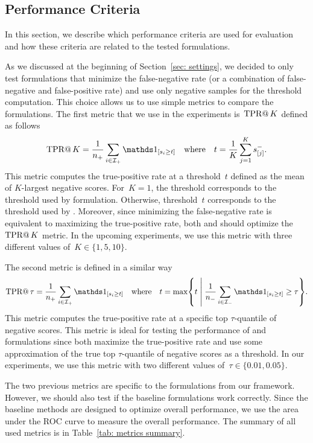 \pagebreak

\subsection{Performance Criteria}\label{sec: performance criteria}

In this section, we describe which performance criteria are used for evaluation and how these criteria are related to the tested formulations.

As we discussed at the beginning of Section~\ref{sec: settings}, we decided to only test formulations that minimize the false-negative rate (or a combination of false-negative and false-positive rate) and use only negative samples for the threshold computation. This choice allows us to use simple metrics to compare the formulations. The first metric that we use in the experiments is~$\operatorname{TPR@}K$ defined as follows
\begin{equation*}
  \tpratk = \frac{1}{\npos} \sum_{i \in \Ipos} \Iverson{s_i \geq t} \quad \text{where} \quad t = \frac{1}{K} \sum_{j = 1}^{K} s^{-}_{[j]}.
\end{equation*}
This metric computes the true-positive rate at a threshold~$t$ defined as the mean of $K$-largest negative scores. For~$K = 1$, the threshold corresponds to the threshold used by \TopPush formulation. Otherwise, threshold~$t$ corresponds to the threshold used by \TopPushK. Moreover, since minimizing the false-negative rate is equivalent to maximizing the true-positive rate, both \TopPush and \TopPushK should optimize the $\operatorname{TPR@}K$ metric. In the upcoming experiments, we use this metric with three different values of~$K \in \{1, 5, 10\}.$

The second metric is defined in a similar way
\begin{equation*}
  \tpratfpr = \frac{1}{\npos} \sum_{i \in \Ipos} \Iverson{s_i \geq t} \quad \text{where} \quad t
  = \max \Set{t}{\frac{1}{\nneg} \sum_{i \in \Ineg} \Iverson{s_i \geq t} \geq \tau}.
\end{equation*}
This metric computes the true-positive rate at a specific top $\tau$-quantile of negative scores. This metric is ideal for testing the performance of \tauFPL and \PatMatNP formulations since both maximize the true-positive rate and use some approximation of the true top $\tau$-quantile of negative scores as a threshold. In our experiments, we use this metric with two different values of~$\tau \in \{0.01, 0.05\}.$

The two previous metrics are specific to the formulations from our framework. However, we should also test if the baseline formulations work correctly. Since the baseline methods are designed to optimize overall performance, we use the area under the ROC curve to measure the overall performance. The summary of all used metrics is in Table~\ref{tab: metrics summary}.

